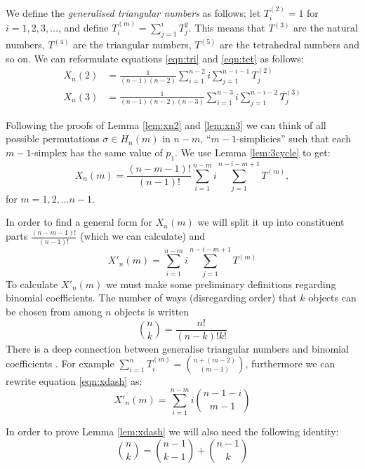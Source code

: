 \documentclass[oneside]{book} %
\theoremstyle{definition}
\numberwithin{equation}{section}
\begin{document}
We define the \emph{generalised triangular numbers} as follows: let $T^{(2)}_i = 1$ for $i = 1,2,3,\dots$, and define $T^{(m)}_{i} = \sum_{j=1}^iT_{j}^{2}$.  This means that $T^{(3)}$ are the natural numbers, $T^{(4)}$ are the triangular numbers, $T^{(5)}$ are the tetrahedral numbers and so on.  We can reformulate equations \ref{eqn:tri} and \ref{eqn:tet} as follows:
\begin{align}
 X_n(2) &=  \frac{1}{(n-1)(n-2)}\sum_{i=1}^{n-2}i\sum_{j=1}^{n-i-1} T^{(2)}_{j} \\
 X_n(3) &=  \frac{1}{(n-1)(n-2)(n-3)}\sum_{i=1}^{n-3}i \sum_{j=1}^{n-i-2} T^{(3)}_{j} 
\end{align}

Following the proofs of Lemma \ref{lem:xn2} and \ref{lem:xn3} we can think of all possible permutations $\sigma \in H_n(m)$ in $n-m$, ``$m-1$-simplicies'' such that each $m-1$-simplex has the same value of $p_1$. We use Lemma \ref{lem:3cycle} to get:
\begin{equation}
 X_n(m) = \frac{(n-m-1)!}{(n-1)!}\sum_{i=1}^{n-m} i \sum_{j=1}^{n-i-m+1}T^{(m)},
\end{equation}
for $m = 1,2,\dots n-1$.

In order to find a general form for $X_n(m)$ we will split it up into constituent parts $\frac{(n-m-1)!}{(n-1)!}$ (which we can calculate) and 
\begin{equation}\label{eqn:xdash}
 X'_n(m) = \sum_{i=1}^{n-m} i \sum_{j=1}^{n-i-m+1}T^{(m)}
\end{equation}
To calculate $X'_n(m)$ we must make some preliminary definitions regarding binomial coefficients.
The number of ways (disregarding order) that $k$ objects can be chosen from among $n$ objects is written
\[
 {n \choose k} = \frac{n!}{(n-k)!k!}
\]
There is a deep connection between generalise triangular numbers and binomial coefficients \cite{}. For example $\sum_{i=1}^{n}T_i^{(m)} = {n + (m-2)\choose(m-1)}$, furthermore we can rewrite equation \ref{eqn:xdash} as:
\[ X'_n(m) = \sum_{i=1}^{n-m} i  {n-1-i\choose m-1} \]


In order to prove Lemma \ref{lem:xdash} we will also need the following identity:
\begin{equation}\label{eqn:id1}
{{n}\choose{k}} = {{n-1}\choose{k-1}} + {{n-1}\choose{k}}
\end{equation}
\end{document}

